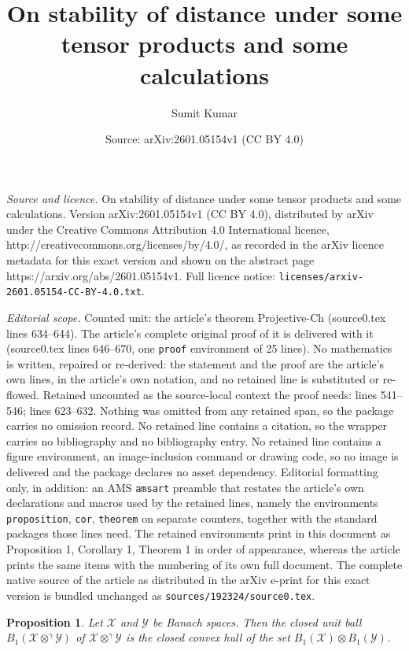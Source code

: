 \documentclass[10pt,a4paper]{amsart}
\title{On stability of distance under some tensor products and some calculations}
\author{Sumit Kumar}
\date{Source: arXiv:2601.05154v1 (CC BY 4.0)}
\newtheorem{proposition}{Proposition}
\newcommand{\mcal}{\mathcal}
\begin{document}
\maketitle

\noindent\emph{Source and licence.} On stability of distance under some tensor products and some calculations. Version arXiv:2601.05154v1 (CC BY 4.0), distributed by arXiv under the Creative Commons Attribution 4.0 International licence, http://creativecommons.org/licenses/by/4.0/, as recorded in the arXiv licence metadata for this exact version and shown on the abstract page https://arxiv.org/abs/2601.05154v1. Full licence notice: \texttt{licenses/arxiv-2601.05154-CC-BY-4.0.txt}.\par\smallskip

\noindent\textit{Editorial scope.} Counted unit: the article's theorem Projective-Ch (source0.tex lines 634--644). The article's complete original proof of it is delivered with it (source0.tex lines 646--670, one \texttt{proof} environment of 25 lines). No mathematics is written, repaired or re-derived: the statement and the proof are the article's own lines, in the article's own notation, and no retained line is substituted or re-flowed.  Retained uncounted as the source-local context the proof needs: lines 541--546; lines 623--632.  Nothing was omitted from any retained span, so the package carries no omission record.  No retained line contains a citation, so the wrapper carries no bibliography and no bibliography entry.  No retained line contains a figure environment, an image-inclusion command or drawing code, so no image is delivered and the package declares no asset dependency.  Editorial formatting only, in addition: an AMS \texttt{amsart} preamble that restates the article's own declarations and macros used by the retained lines, namely the environments \texttt{proposition}, \texttt{cor}, \texttt{theorem} on separate counters, together with the standard packages those lines need.  The retained environments print in this document as Proposition 1, Corollary 1, Theorem 1 in order of appearance, whereas the article prints the same items with the numbering of its own full document.  The complete native source of the article as distributed in the arXiv e-print for this exact version is bundled unchanged as \texttt{sources/192324/source0.tex}.
\begin{proposition}{\label{unit-ball}}
Let $\mcal{X}$ and $\mcal{Y}$ be Banach spaces.  Then the closed unit
ball $B_{1}(\mcal{X} \otimes^{\gamma} \mcal{Y})$ of $\mcal{X}
\otimes^{\gamma} \mcal{Y}$ is the closed convex hull of the set
$B_{1}(\mcal{X})\otimes B_{1}(\mcal{Y})$.
\end{proposition}
\end{document}
